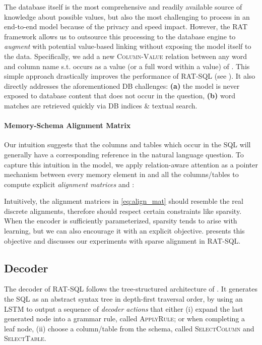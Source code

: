 \documentclass[11pt,a4paper,final]{article}
\begin{document}
The database itself is the most comprehensive and readily available source of knowledge about possible values, but also
the most challenging to process in an end-to-end model because of the privacy and speed impact.
However, the RAT framework allows us to outsource this processing to the database engine to \emph{augment} 
with potential value-based linking without exposing the model itself to the data.
Specifically, we add a new \textsc{Column-Value} relation between any word  and column name  s.t.
 occurs as a value (or a full word within a value) of .
This simple approach drastically improves the performance of RAT-SQL (see ).
It also directly addresses the aforementioned DB challenges:
\textbf{(a)} the model is never exposed to database content that does not occur in the question,
\textbf{(b)} word matches are retrieved quickly via DB indices \& textual search.

\paragraph{Memory-Schema Alignment Matrix}
Our intuition suggests that the columns and tables which occur in the SQL  will generally have a corresponding reference in the natural language question.
To capture this intuition in the model, we apply relation-aware attention as a pointer mechanism between every memory element in  and all the columns/tables to compute explicit \emph{alignment matrices}  and :


Intuitively, the alignment matrices in \cref{eq:align_mat} should resemble the real discrete alignments, therefore should respect certain constraints like sparsity.
When the encoder is sufficiently parameterized, sparsity tends to arise with learning, but we can also encourage it with an explicit objective.
 presents this objective and discusses our experiments with sparse alignment in RAT-SQL.

\subsection{Decoder}
\label{sec:decoder}
The decoder  of RAT-SQL follows the tree-structured architecture of \citet{yinSyntacticNeuralModel2017a}.
It generates the SQL  as an abstract syntax tree in depth-first traversal order,
by using an LSTM to output a sequence of \emph{decoder actions} that either (i) expand the last generated node into a grammar rule, called \textsc{ApplyRule}; or when completing a leaf node, (ii) choose a
column/table from the schema, called \textsc{SelectColumn} and \textsc{SelectTable}.
\end{document}
